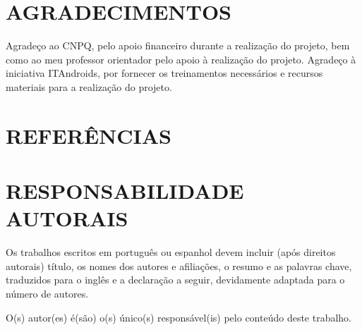 \documentclass[10pt,fleqn,a4paper]{article}
\begin{document}
	\section{AGRADECIMENTOS}
	
	Agradeço ao CNPQ, pelo apoio financeiro durante a realização do projeto, bem como ao meu professor orientador pelo apoio à realização do projeto. Agradeço à iniciativa ITAndroids, por fornecer os treinamentos necessários e recursos materiais para a realização do projeto.
	
	\section{REFERÊNCIAS}
	
	
	
	\section{RESPONSABILIDADE AUTORAIS}
	
	Os trabalhos escritos em português ou espanhol devem incluir (após direitos autorais) título, os nomes dos autores e afiliações, o resumo e as palavras chave, traduzidos para o inglês e a declaração a seguir, devidamente adaptada para o número de autores.
	
	O(s) autor(es) é(são) o(s) único(s) responsável(is) pelo conteúdo deste trabalho.
	
\end{document}

